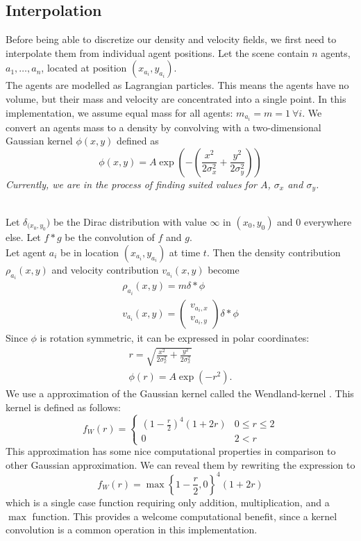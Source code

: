\documentclass{article}
\begin{document}
\subsection{Interpolation}
Before being able to discretize our density and velocity fields, we first need to interpolate them from individual agent positions. Let the scene contain $n$ agents, $a_1,\dots,a_n$, located at position $(x_{a_i},y_{a_i})$.
\ \\
The agents are modelled as Lagrangian particles. This means the agents have no volume, but their mass and velocity are concentrated into a single point.
In this implementation, we assume equal mass for all agents: $m_{a_i}=m = 1\ \forall i$. 
We convert an agents mass to a density by convolving with a two-dimensional Gaussian kernel $\phi(x,y)$ defined as 
\begin{equation}
	\label{eq:gaussian}
	\phi(x,y)=A \exp\left(-\left(\frac{x^2}{2\sigma_x^2}+\frac{y^2}{2\sigma_y^2}\right)\right)
\end{equation}
\emph{Currently, we are in the process of finding suited values for $A$, $\sigma_x$ and $\sigma_y$.}

\ \\
Let $\delta_{(x_0,y_0})$ be the Dirac distribution with value $\infty$ in $(x_0,y_0)$ and 0 everywhere else. Let $f*g$ be the convolution of $f$ and $g$. 
\ \\
Let agent $a_i$ be in location $(x_{a_i},y_{a_i})$ at time $t$. Then the density contribution $\rho_{a_i}(x,y)$ and velocity contribution $v_{a_i}(x,y)$ become
\begin{align}
	\rho_{a_i}(x,y) = m\delta*\phi\\
	v_{a_i}(x,y) = \begin{pmatrix}v_{a_i,x}\\v_{a_i,y}\end{pmatrix}\delta*\phi
\end{align}
Since $\phi$ is rotation symmetric, it can be expressed in polar coordinates:
\begin{align}
	r = \sqrt{\frac{x^2}{2\sigma_x^2}+\frac{y^2}{2\sigma_x^2}}\\
	\phi(r) = A\exp\left(-r^2\right).
\end{align}
We use a approximation of the Gaussian kernel called the Wendland-kernel \cite{violeau12}. This kernel is defined as follows:
\begin{equation}
	\label{eq:wendland}
	f_W(r) = \begin{cases}
				\left(1-\frac{r}{2}\right)^4(1+2r)& 0\leq r \leq 2\\
				0 & 2 < r 
			\end{cases}
\end{equation}
This approximation has some nice computational properties in comparison to other Gaussian approximation. We can reveal them by rewriting the expression to 
\begin{equation}
	f_W(r) = \max\left\{1-\frac{r}{2},0\right\}^4(1+2r)
\end{equation}
which is a single case function requiring only addition, multiplication, and a $\max$ function. This provides a welcome computational benefit, since a kernel convolution is a common operation in this implementation.
\end{document}
